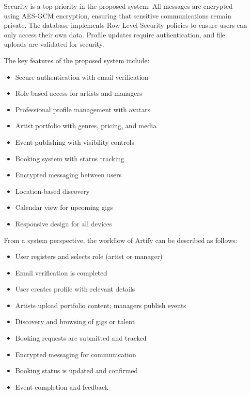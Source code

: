 \documentclass[12pt,a4paper]{report}
\begin{document}
Security is a top priority in the proposed system. All messages are encrypted using AES-GCM encryption, ensuring that sensitive communications remain private. The database implements Row Level Security policies to ensure users can only access their own data. Profile updates require authentication, and file uploads are validated for security.

The key features of the proposed system include:

\begin{itemize}
\item Secure authentication with email verification

\item Role-based access for artists and managers

\item Professional profile management with avatars

\item Artist portfolio with genres, pricing, and media

\item Event publishing with visibility controls

\item Booking system with status tracking

\item Encrypted messaging between users

\item Location-based discovery

\item Calendar view for upcoming gigs

\item Responsive design for all devices
\end{itemize}

From a system perspective, the workflow of Artify can be described as follows:

\begin{itemize}
\item User registers and selects role (artist or manager)

\item Email verification is completed

\item User creates profile with relevant details

\item Artists upload portfolio content; managers publish events

\item Discovery and browsing of gigs or talent

\item Booking requests are submitted and tracked

\item Encrypted messaging for communication

\item Booking status is updated and confirmed

\item Event completion and feedback
\end{itemize}
\end{document}
